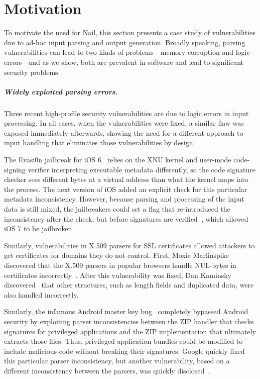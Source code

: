 \chapter{Motivation}
\label{s:motivation}

To motivate the need for Nail, this section presents a case study of
vulnerabilities due to ad-hoc input parsing and output generation.
Broadly speaking, parsing vulnerabilities can lead to two kinds of
problems---memory corruption and logic errors---and as we show, both
are prevalent in software and lead to significant security problems.

\paragraph{Widely exploited parsing errors.}

Three recent high-profile security vulnerabilities are due to logic
errors in input processing.  In all cases, when the vulnerabilities were
fixed, a similar flaw was exposed immediately afterwards, showing the
need for a different approach to input handling that eliminates those
vulnerabilities by design.

The Evasi0n jailbreak for iOS 6~\cite{evaders6} relies on the XNU kernel and
user-mode code-signing verifier interpreting executable metadata differently, so the code signature
checker sees different bytes at a virtual address than what the kernel maps into the process. The next version of iOS
added an explicit check for this particular metadata inconsistency. However, because parsing and
processing of the input data is still mixed, the jailbreakers could set a flag that re-introduced
the inconsistency after the check, but before signatures are verified~\cite{geohot-evasion}, which
allowed iOS 7 to be jailbroken.

Similarly, vulnerabilities in X.509 parsers for SSL certificates allowed attackers to get
certificates for domains they do not control. First, Moxie Marlinspike discovered that the X.509
parsers in popular browsers handle NUL-bytes in certificates incorrectly~\cite{Marlinspike:SSL}. After this
vulnerability was fixed, Dan Kaminsky discovered~\cite{DBLP:conf/fc/KaminskyPS10} that other
structures, such as length fields and duplicated data, were also handled incorrectly.

Similarly, the infamous Android master key bug~\cite{saurik-masterkey} completely bypassed Android
security by exploiting parser inconsistencies
between the ZIP handler that checks signatures for privileged applications and the ZIP
implementation that ultimately extracts those files. Thus, privileged application bundles could be
modified to include malicious code without breaking their signatures. Google quickly fixed this
particular parser inconsistency, but another vulnerability, based on a different inconsistency
between the parsers, was quickly disclosed~\cite{saurik-masterkey2}.

